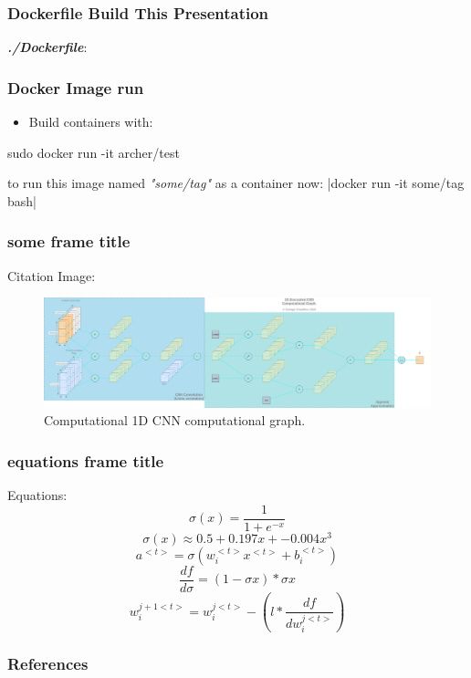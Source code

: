 \documentclass{beamer}
\begin{document}
  \begin{frame}
    \frametitle{Dockerfile Build This Presentation}
    \textbf{\textit{./Dockerfile}}:
  \end{frame}

  \begin{frame}[fragile]%
    \frametitle{Docker Image run}
    \begin{itemize}
        \item Build containers with:
    \end{itemize}
    \begin{bashcode}%
      sudo docker run -it archer/test
    \end{bashcode}
    to run this image named \textit{"some/tag"} as a container now:
    |docker run -it some/tag bash|
  \end{frame}

  \begin{frame}
    \frametitle{some frame title}
    Citation \autocite{gentry2009fully, Goodfellow-et-al-2016}
    Image:
    \begin{figure}[th!]
      \centering
      \includegraphics[width=\textwidth]{encrypted_cnn.png}
      \caption{Computational 1D CNN computational graph.}
      \label{fig:gan}
    \end{figure}
  \end{frame}

  \begin{frame}
    \frametitle{equations frame title}
    Equations:
    \begin{equation}
      \label{sigmoid}
      \sigma(x) = \frac{1}{1+e^{-x}}
    \end{equation}
    \begin{equation}
      \label{sigmoid_approx}
      \sigma(x) \approx 0.5 + 0.197x + -0.004x^3
    \end{equation}
    \begin{equation}
      \label{cnn_activation}
      a^{<t>}=\sigma(w_{i}^{<t>}x^{<t>}+b_i^{<t>})
    \end{equation}
    \begin{equation}
      \label{gradient}
      \frac{df}{d\sigma} = (1-\sigma{x}) * \sigma{x}
    \end{equation}
    \begin{equation}
      \label{weight_update}
      w_i^{j+1<t>} = w_i^{j<t>} - (l * \frac{df}{dw_i^{j<t>}})
    \end{equation}
  \end{frame}

  \begin{frame}[allowframebreaks]
    \frametitle{References}
    \printbibliography
  \end{frame}
\end{document}
